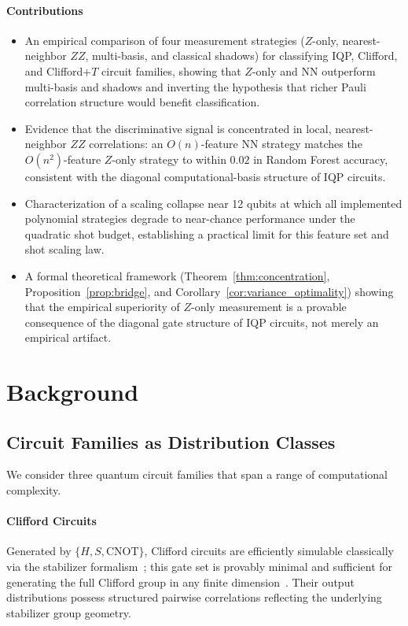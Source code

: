 \documentclass[conference]{IEEEtran}
\newcommand{\nqubits}{n}
\begin{document}
\paragraph*{Contributions}
\begin{itemize}
    \item An empirical comparison of four measurement strategies ($Z$-only, nearest-neighbor $ZZ$, multi-basis, and classical shadows) for classifying IQP, Clifford, and Clifford$+T$ circuit families, showing that $Z$-only and NN outperform multi-basis and shadows and inverting the hypothesis that richer Pauli correlation structure would benefit classification.
    \item Evidence that the discriminative signal is concentrated in local, nearest-neighbor $ZZ$ correlations: an $O(\nqubits)$-feature NN strategy matches the $O(\nqubits^2)$-feature $Z$-only strategy to within $0.02$ in Random Forest accuracy, consistent with the diagonal computational-basis structure of IQP circuits.
    \item Characterization of a scaling collapse near 12 qubits at which all implemented polynomial strategies degrade to near-chance performance under the quadratic shot budget, establishing a practical limit for this feature set and shot scaling law.
    \item A formal theoretical framework (Theorem~\ref{thm:concentration}, Proposition~\ref{prop:bridge}, and Corollary~\ref{cor:variance_optimality}) showing that the empirical superiority of $Z$-only measurement is a provable consequence of the diagonal gate structure of IQP circuits, not merely an empirical artifact.
\end{itemize}

\section{Background}
\label{sec:background}

\subsection{Circuit Families as Distribution Classes}

We consider three quantum circuit families that span a range of computational complexity.

\paragraph{Clifford Circuits}
Generated by $\{H, S, \mathrm{CNOT}\}$, Clifford circuits are efficiently simulable classically via the stabilizer formalism~\cite{gottesman1997stabilizer}; this gate set is provably minimal and sufficient for generating the full Clifford group in any finite dimension~\cite{farinholt2014ideal}.
Their output distributions possess structured pairwise correlations reflecting the underlying stabilizer group geometry.
\end{document}
